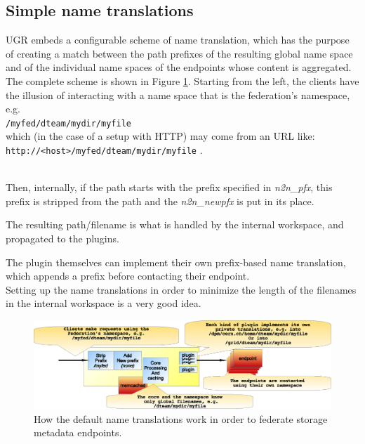 \documentclass[12pt]{article} %
\begin{document}
\subsection{Simple name translations}

UGR embeds a configurable scheme of name translation, which has the purpose of creating a match between the path prefixes of the resulting global name space and of the individual name spaces of the endpoints whose content is aggregated.\\
The complete scheme is shown in Figure \ref{fig_n2n}. Starting from the left, the clients have the illusion of interacting with a name space that is the federation's namespace, e.g.\\

\lstinline{/myfed/dteam/mydir/myfile}\\
 
 which (in the case of a setup with HTTP) may come from an URL like:\\
 
 \lstinline"http://<host>/myfed/dteam/mydir/myfile" .\\\
 
 Then, internally, if the path starts with the prefix specified in \textit{n2n\_pfx}, this prefix is stripped from the path and the \textit{n2n\_newpfx} is put in its place.
 
 The resulting path/filename is what is handled by the internal workspace, and propagated to the plugins.
 
  The plugin themselves can implement their own prefix-based name translation, which appends a prefix before contacting their endpoint.\\
  
 Setting up the name translations in order to minimize the length of the filenames in the internal workspace is a very good idea.\\





\begin{figure}
  \begin{center}
    \includegraphics[width=36pc]{n2n.eps}
  \end{center}
  \caption{\label{fig_n2n}How the default name translations work in order to federate storage metadata endpoints.}
\end{figure}
\end{document}

